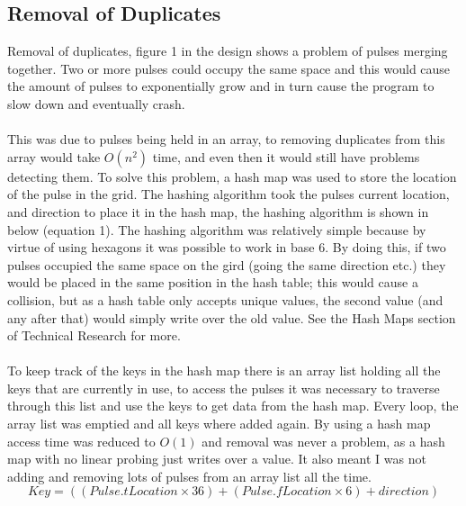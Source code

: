 \documentclass[10pt,a4paper]{article}
\begin{document}
\subsection{Removal of Duplicates}
Removal of duplicates, figure 1 in the design shows a problem of pulses merging together. Two or more pulses could occupy the same space and this would cause the amount of pulses to exponentially grow and in turn cause the program to slow down and eventually crash.\\
\\
This was due to pulses being held in an array, to removing duplicates from this array would take $ O(n^{2}) $ time, and even then it would still have problems detecting them. To solve this problem, a hash map was used to store the location of the pulse in the grid. The hashing algorithm took the pulses current location, and direction to place it in the hash map, the hashing algorithm is shown in below (equation 1). The hashing algorithm was relatively simple because by virtue of using hexagons it was possible to work in base 6. By doing this, if two pulses occupied the same space on the gird (going the same direction etc.) they would be placed in the same position in the hash table; this would cause a collision, but as a hash table only accepts unique values, the second value (and any after that) would simply write over the old value. See the Hash Maps section of Technical Research for more.\\
\\
To keep track of the keys in the hash map there is an array list holding all the keys that are currently in use, to access the pulses it was necessary to traverse through this list and use the keys to get data from the hash map. Every loop, the array list was emptied and all keys where added again. By using a hash map access time was reduced to $O(1)$ and removal was never a problem, as a hash map with no linear probing just writes over a value. It also meant I was not adding and removing lots of pulses from an array list all the time.\\
\begin{equation}
Key = ((Pulse.tLocation \times 36) + (Pulse.fLocation \times 6) + direction)
\end{equation}
\end{document}
